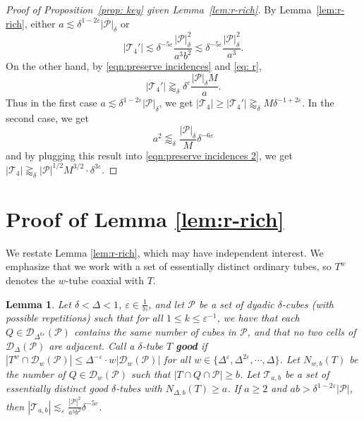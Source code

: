 \documentclass{amsart}
\newtheorem{lemma}[prop]{Lemma}
\newcommand{\N}{\mathbb{N}}
\newcommand{\T}{\mathcal{T}}
\newcommand{\eps}{\varepsilon}
\newcommand{\geapp}{\gtrapprox}
\newcommand{\lesim}{\lesssim}
\newcommand{\cD}{\mathcal{D}}
\newcommand{\cT}{\mathcal{T}}
\newcommand{\cP}{\mathcal{P}}
\newcommand{\ord}{\mathrm{ord}}
\begin{document}
\begin{proof}[Proof of Proposition~\ref{prop: key} given Lemma~\ref{lem:r-rich}]
    By Lemma~\ref{lem:r-rich}, 
    either $a\lesssim \delta^{1-2\eps}|\cP|_{\delta}$ or 
    \[
    |\cT_4'|\lesssim  \delta^{-5\eps} \frac{|\cP|_{\delta}^2}{a^3 b^2} \lesssim \delta^{-5\eps} \frac{|\cP|_{\delta}^2}{a^3}.
    \]
    On the other hand, by \eqref{eqn:preserve incidences} and \eqref{eq: r}, 
    \begin{equation}\label{eqn:preserve incidences 2}
        |\cT_4'| \gtrapprox_{\delta}  \delta^{\eps} \frac{|\cP|_{\delta} M}{a}.
    \end{equation}
    Thus in the first case $a\lesssim \delta^{1-2\eps}|\cP|_{\delta}$, we get $|\T_4| \ge |\T_4'| \geapp_\delta M \delta^{-1+2\eps}$. In the second case, we get
    \[
    a^2\lessapprox_{\delta} \frac{|\cP|_{\delta}}{M} \delta^{-6\eps}
    \]
    and by plugging this result into \eqref{eqn:preserve incidences 2}, we get $|\T_4| \gtrapprox_{\delta} |\cP|^{1/2} M^{3/2} \cdot \delta^{3\eps}.$ %
\end{proof}

\section{Proof of Lemma \ref{lem:r-rich}}
We restate Lemma \ref{lem:r-rich}, which may have independent interest. We emphasize that we work with a set of essentially distinct ordinary tubes, so $T^w$ denotes the $w$-tube coaxial with $T$.
\begin{lemma}\label{lem:r-rich'}
    Let $\delta < \Delta < 1$, $\eps \in \frac{1}{\N}$, and let $\cP$ be a set of dyadic $\delta$-cubes (with possible repetitions) such that for all $1 \le k \le \eps^{-1}$, we have that each $Q \in \cD_{\Delta^{k\eps}} (\cP)$ contains the same number of cubes in $\cP$, and that no two cells of $\cD_\Delta (\cP)$ are adjacent. Call a $\delta$-tube $T$ \textbf{good} if $|T^w \cap \cD_w (\cP)| \le \Delta^{-\eps} \cdot w |\cD_w (\cP)|$ for all $w \in \{ \Delta^\eps, \Delta^{2\eps}, \cdots, \Delta \}$. Let $N_{w, b} (T)$ be the number of $Q \in \cD_w (\cP)$ such that $|T \cap Q \cap \cP| \ge b$. Let $\T_{a,b}$ be a set of essentially distinct good $\delta$-tubes with $N_{\Delta, b} (T) \ge a$. If $a \ge 2$ and $ab > \delta^{1-2\eps} |\cP|$, then $|\T_{a,b}| \lesim_{\eps} \frac{|\cP|^2}{a^3 b^2} \delta^{-5\eps}$.
\end{lemma}
\end{document}
